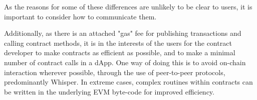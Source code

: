 As the reasons for some of these differences are unlikely to be clear to users, it is important to consider how to communicate them.

Additionally, as there is an attached "gas" fee for publishing transactions and calling contract methods, it is in the interests of the users for the contract developer to make contracts as efficient as possible, and to make a minimal number of contract calls in a dApp. One way of doing this is to avoid on-chain interaction wherever possible, through the use of peer-to-peer protocols, predominantly Whisper. In extreme cases, complex routines within contracts can be written in the underlying EVM byte-code for improved efficiency.
